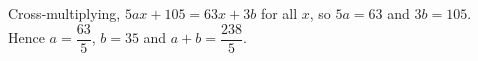 Cross-multiplying, $5ax+105=63x+3b$ for all $x$, so $5a=63$ and $3b=105$. Hence $a=\dfrac{63}{5}$, $b=35$ and $a+b=\boxed{\dfrac{238}{5}}$.
